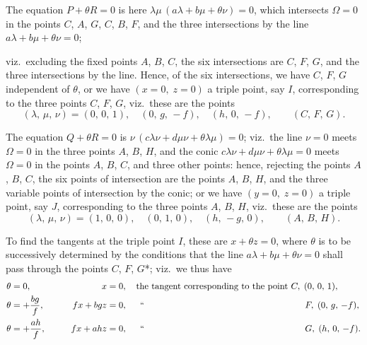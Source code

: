 \documentclass[12pt,a4paper]{article}
\begin{document}
The equation $P+\theta R=0$ is here $\lambda\mu\,(a\lambda+b\mu+\theta\nu)=0$, which intersects $\Omega=0$ in the points $C$, $A$, $G$, $C$, $B$, $F$, and the three intersections by the line $a\lambda+b\mu+\theta\nu=0$;

\newpage

\noindent
viz.\ excluding the fixed points $A$, $B$, $C$, the six intersections are $C$, $F$, $G$, and the three intersections by the line. Hence, of the six intersections, we have $C$, $F$, $G$ independent of $\theta$, or we have $(x=0,\; z=0)$ a triple point, say $I$, corresponding to the three points $C$, $F$, $G$, viz.\ these are the points
\[
(\lambda,\,\mu,\,\nu) = (0,\,0,\,1),\quad (0,\,g,\,-f),\quad (h,\,0,\,-f), \qquad (C,\,F,\,G).
\]

The equation $Q+\theta R=0$ is $\nu\,(c\lambda\nu+d\mu\nu+\theta\lambda\mu)=0$; viz.\ the line $\nu=0$ meets $\Omega=0$ in the three points $A$, $B$, $H$, and the conic $c\lambda\nu+d\mu\nu+\theta\lambda\mu=0$ meets $\Omega=0$ in the points $A$, $B$, $C$, and three other points: hence, rejecting the points $A$, $B$, $C$, the six points of intersection are the points $A$, $B$, $H$, and the three variable points of intersection by the conic; or we have $(y=0,\; z=0)$ a triple point, say $J$, corresponding to the three points $A$, $B$, $H$, viz.\ these are the points
\[
(\lambda,\,\mu,\,\nu) = (1,\,0,\,0),\quad (0,\,1,\,0),\quad (h,\,-g,\,0), \qquad (A,\,B,\,H).
\]

To find the tangents at the triple point $I$, these are $x+\theta z=0$, where $\theta$ is to be successively determined by the conditions that the line $a\lambda+b\mu+\theta\nu=0$ shall pass through the points $C$, $F$, $G$*; viz.\ we thus have
\begin{alignat*}{3}
\theta &= 0, &\qquad x &= 0, \quad \text{the tangent corresponding to the point } C,\; (0,\,0,\,1), \\
\theta &= +\frac{bg}{f}, &\qquad fx+bgz &= 0, \quad\;\, \text{``\quad\quad\quad\quad\quad\quad\quad\quad\quad\quad\quad\quad\quad\quad\quad\quad\quad\quad} F,\; (0,\,g,\,-f), \\
\theta &= +\frac{ah}{f}, &\qquad fx+ahz &= 0, \quad\;\, \text{``\quad\quad\quad\quad\quad\quad\quad\quad\quad\quad\quad\quad\quad\quad\quad\quad\quad\quad} G,\; (h,\,0,\,-f).
\end{alignat*}
\end{document}
